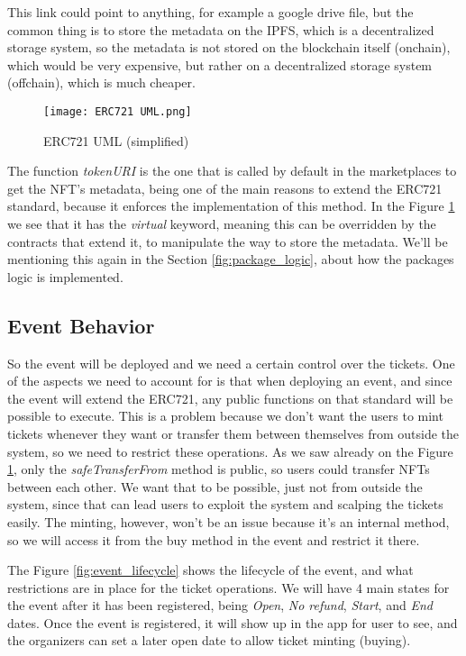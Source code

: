 This link could point to anything, for example a google drive file, but the
common thing is to store the metadata on the IPFS, which is a decentralized
storage system, so the metadata is not stored on the blockchain itself
(onchain), which would be very expensive, but rather on a decentralized storage
system (offchain), which is much cheaper.

\begin{figure}[H]
	\texttt{[image: ERC721 UML.png]}
	\centering
	\caption{ERC721 UML (simplified)}
	\label{fig:erc721_uml}
\end{figure}

The function \textit{tokenURI} is the one that is called by default in the
marketplaces to get the NFT's metadata, being one of the main reasons to extend
the ERC721 standard, because it enforces the implementation of this method. In
the Figure \ref{fig:erc721_uml} we see that it has the \textit{virtual}
keyword, meaning this can be overridden by the contracts that extend it, to
manipulate the way to store the metadata. We'll be mentioning this again in the
Section \ref{fig:package_logic}, about how the packages logic is implemented.

\subsection{Event Behavior}
\label{subsec:event_behavior}

So the event will be deployed and we need a certain control over the tickets.
One of the aspects we need to account for is that when deploying an event, and
since the event will extend the ERC721, any public functions on that standard
will be possible to execute. This is a problem because we don't want the users
to mint tickets whenever they want or transfer them between themselves from
outside the system, so we need to restrict these operations. As we saw already
on the Figure \ref{fig:erc721_uml}, only the \textit{safeTransferFrom} method
is public, so users could transfer NFTs between each other. We want that to be
possible, just not from outside the system, since that can lead users to
exploit the system and scalping the tickets easily. The minting, however, won't
be an issue because it's an internal method, so we will access it from the buy
method in the event and restrict it there.

The Figure \ref{fig:event_lifecycle} shows the lifecycle of the event, and what
restrictions are in place for the ticket operations. We will have 4 main states
for the event after it has been registered, being \textit{Open}, \textit{No
	refund}, \textit{Start}, and \textit{End} dates. Once the event is registered,
it will show up in the app for user to see, and the organizers can set a later
open date to allow ticket minting (buying).

